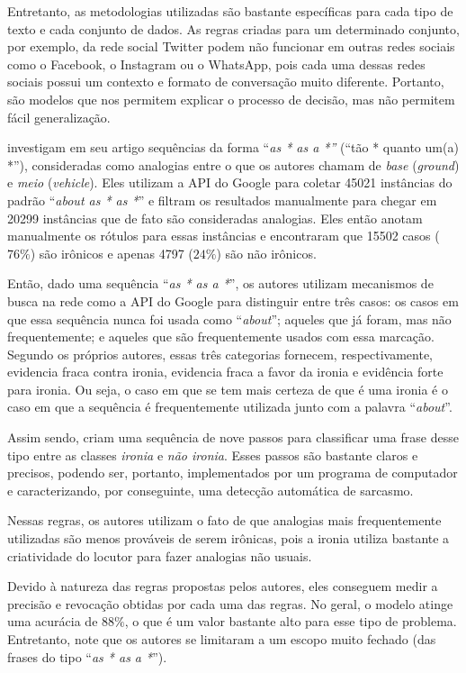 Entretanto, as metodologias utilizadas são bastante específicas para cada tipo
de texto e cada conjunto de dados. As regras criadas para um determinado
conjunto, por exemplo, da rede social Twitter podem não funcionar em outras
redes sociais como o Facebook, o Instagram ou o WhatsApp, pois cada uma dessas
redes sociais possui um contexto e formato de conversação muito diferente.
Portanto, são modelos que nos permitem explicar o processo de decisão, mas não
permitem fácil generalização.

\cite{veale:2010} investigam em seu artigo sequências da forma ``\textit{as * as
a *''} (``tão * quanto um(a) *''), consideradas como analogias entre o que os
autores chamam de \textit{base} (\textit{ground}) e \textit{meio}
(\textit{vehicle}). Eles utilizam a API do Google para coletar 45021 instâncias
do padrão ``\textit{about as * as *}'' e filtram os resultados manualmente para
chegar em 20299 instâncias que de fato são consideradas analogias. Eles então
anotam manualmente os rótulos para essas instâncias e encontraram que 15502
casos ($76\%$) são irônicos e apenas 4797 ($24\%$) são não irônicos.

Então, dado uma sequência ``\textit{as * as a *}'', os autores utilizam
mecanismos de busca na rede como a API do Google para distinguir entre três
casos: os casos em que essa sequência nunca foi usada como ``\textit{about}'';
aqueles que já foram, mas não frequentemente; e aqueles que são frequentemente
usados com essa marcação. Segundo os próprios autores, essas três categorias
fornecem, respectivamente, evidencia fraca contra ironia, evidencia fraca a
favor da ironia e evidência forte para ironia. Ou seja, o caso em que se tem
mais certeza de que é uma ironia é o caso em que a sequência é frequentemente
utilizada junto com a palavra ``\textit{about}''.

Assim sendo, \cite{veale:2010} criam uma sequência de nove passos para
classificar uma frase desse tipo entre as classes \textit{ironia} e \textit{não
ironia}. Esses passos são bastante claros e precisos, podendo ser, portanto,
implementados por um programa de computador e caracterizando, por conseguinte,
uma detecção automática de sarcasmo.

Nessas regras, os autores utilizam o fato de que analogias mais frequentemente
utilizadas são menos prováveis de serem irônicas, pois a ironia utiliza bastante
a criatividade do locutor para fazer analogias não usuais.

Devido à natureza das regras propostas pelos autores, eles conseguem medir a
precisão e revocação obtidas por cada uma das regras. No geral, o modelo atinge
uma acurácia de $88\%$, o que é um valor bastante alto para esse tipo de
problema. Entretanto, note que os autores se limitaram a um escopo muito fechado
(das frases do tipo ``\textit{as * as a *}'').

